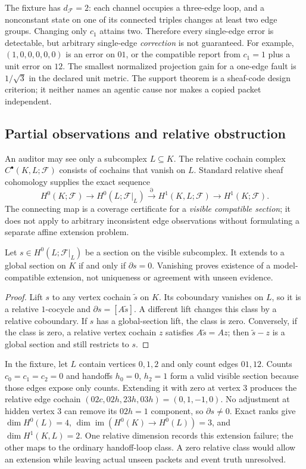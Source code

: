 \documentclass[11pt,a4paper]{article}
\begin{document}
The fixture has $d_{\mathcal F}=2$: each channel occupies a three-edge loop, and a nonconstant state on one of its connected triples changes at least two edge groups. Changing only $c_1$ attains two. Therefore every single-edge error is detectable, but arbitrary single-edge \emph{correction} is not guaranteed. For example, $(1,0,0,0,0,0)$ is an error on $01$, or the compatible report from $c_1=1$ plus a unit error on $12$. The smallest normalized projection gain for a one-edge fault is $1/\sqrt3$ in the declared unit metric. The support theorem is a sheaf-code design criterion; it neither names an agentic cause nor makes a copied packet independent.

\subsection{Partial observations and relative obstruction}\label{sec:relative}
An auditor may see only a subcomplex $L\subseteq K$. The relative cochain complex $C^\bullet(K,L;\mathcal F)$ consists of cochains that vanish on $L$. Standard relative sheaf cohomology supplies the exact sequence~\cite{hansen2019}
\[
H^0(K;\mathcal F)\longrightarrow H^0(L;\mathcal F|_L)
\xrightarrow{\partial}H^1(K,L;\mathcal F)
\longrightarrow H^1(K;\mathcal F).
\]
The connecting map is a coverage certificate for a \emph{visible compatible section}; it does not apply to arbitrary inconsistent edge observations without formulating a separate affine extension problem.

\begin{theorem}\label{thm:relative-extension}
Let $s\in H^0(L;\mathcal F|_L)$ be a section on the visible subcomplex. It extends to a global section on $K$ if and only if $\partial s=0$. Vanishing proves existence of a model-compatible extension, not uniqueness or agreement with unseen evidence.
\end{theorem}
\begin{proof}
Lift $s$ to any vertex cochain $\widetilde s$ on $K$. Its coboundary vanishes on $L$, so it is a relative $1$-cocycle and $\partial s=[A\widetilde s]$. A different lift changes this class by a relative coboundary. If $s$ has a global-section lift, the class is zero. Conversely, if the class is zero, a relative vertex cochain $z$ satisfies $A\widetilde s=Az$; then $\widetilde s-z$ is a global section and still restricts to $s$.
\end{proof}

In the fixture, let $L$ contain vertices $0,1,2$ and only count edges $01,12$. Counts $c_0=c_1=c_2=0$ and handoffs $h_0=0$, $h_2=1$ form a valid visible section because those edges expose only counts. Extending it with zero at vertex $3$ produces the relative edge cochain $(02c,02h,23h,03h)=(0,1,-1,0)$. No adjustment at hidden vertex $3$ can remove its $02h=1$ component, so $\partial s\ne0$. Exact ranks give $\dim H^0(L)=4$, $\dim\operatorname{im}(H^0(K)\to H^0(L))=3$, and $\dim H^1(K,L)=2$. One relative dimension records this extension failure; the other maps to the ordinary handoff-loop class. A zero relative class would allow an extension while leaving actual unseen packets and event truth unresolved.
\end{document}

